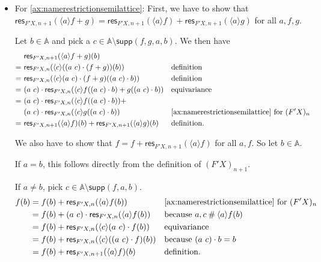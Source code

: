 \documentclass[a4paper,UKenglish,cleveref,thm-restate,numberwithinsect,final]{lipics-v2021}
\newcommand{\res}{\mathsf{res}}
\newcommand{\Names}{\mathbb{A}}
\newcommand{\fresh}{\mathbin{\#}}
\newcommand{\supp}{\mathsf{supp}}
\newcommand{\bind}[1]{\langle #1\rangle}
\theoremstyle{plain}
\numberwithin{equation}{section}
\newcommand{\+}[1]{\mathcal{#1}\xspace}
\theoremstyle{definition}
\begin{document}
\begin{itemize}
  \item For \eqref{ax:namerestrictionsemilattice}:
    First, we have to show that \(\res_{F'X, n+1}(\bind{a} f + g) = \res_{F'X, n+1}(\bind{a} f) + \res_{F'X, n+1}(\bind{a} g)\) for all \(a,f,g\).

    Let \(b \in \Names\) and pick a \(c \in \Names \setminus \supp(f,g,a,b)\).
    We then have
    \begin{align*}
      &\res_{F'X,n+1}(\bind{a} f + g)(b) \\
      =~&\res_{F'X,n}(\bind{c} ((a\ c) \cdot (f + g))(b)) && \text{definition} \\
      =~&\res_{F'X,n}(\bind{c} (a\ c) \cdot (f + g)((a\ c) \cdot b)) && \text{definition} \\
      =~&(a\ c) \cdot \res_{F'X,n}(\bind{c} f((a\ c) \cdot b) + g((a\ c) \cdot b)) && \text{equivariance} \\
      =~&(a\ c) \cdot \res_{F'X,n}(\bind{c} f((a\ c) \cdot b)) + \\&(a\ c) \cdot \res_{F'X,n}(\bind{c} g((a\ c) \cdot b)) && \text{\eqref{ax:namerestrictionsemilattice} for } (F'X)_n \\
      =~&\res_{F'X,n+1}(\bind{a} f)(b) + \res_{F'X,n+1}(\bind{a} g)(b) && \text{definition}.
    \end{align*}

    We also have to show that \(f = f + \res_{F'X, n+1}(\bind{a} f)\) for all \(a,f\).
    So let \(b \in \Names\).

    If \(a = b\), this follows directly from the definition of \((F'X)_{n + 1}\).

    If \(a \neq b\), pick \(c \in \Names \setminus \supp(f,a,b)\).
    \begin{align*}
      f(b)
      &= f(b) + \res_{F'X,n}(\bind{a} f(b)) && \text{\eqref{ax:namerestrictionsemilattice} for } (F'X)_n \\
      &= f(b) + (a\ c) \cdot \res_{F'X, n}(\bind{a} f(b)) && \text{because } a,c\fresh\bind{a}f(b) \\
      &= f(b) + \res_{F'X, n}(\bind{c} (a\ c) \cdot f(b)) && \text{equivariance} \\
      &= f(b) + \res_{F'X, n}(\bind{c} ((a\ c) \cdot f)(b)) && \text{because } (a\ c) \cdot b = b \\
      &= f(b) + \res_{F'X,n+1}(\bind{a}f)(b) && \text{definition}.
    \end{align*}
\end{itemize}
\end{document}
